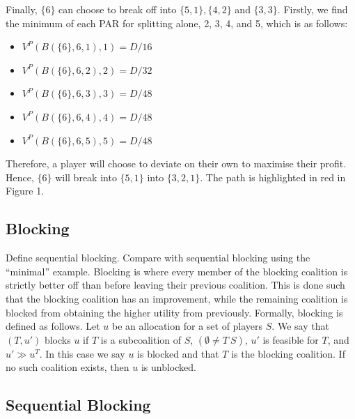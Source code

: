 \documentclass[sigconf,anonymous]{aamas}
\newcommand{\ykc}[1]{{\color{blue} #1}}
\begin{document}
Finally, $\{6\}$ can choose to break off into $\{5, 1\}, \{4, 2\}$ and $\{3, 3\}$. Firstly, we find the minimum of each PAR for splitting alone, 2, 3, 4, and 5, which is as follows: 
\begin{itemize}
	\item $V^P(B(\{6\}, 6, 1), 1) = D/16$
	\item $V^P(B(\{6\}, 6, 2), 2) = D/32$ 
	\item $V^P(B(\{6\}, 6, 3), 3) = D/48$
	\item $V^P(B(\{6\}, 6, 4), 4) = D/48$
	\item $V^P(B(\{6\}, 6, 5), 5) = D/48$
\end{itemize}
Therefore, a player will choose to deviate on their own to maximise their profit. Hence, $\{6\}$ will break into $\{5, 1\}$ into $\{3, 2, 1\}$. The path is highlighted in red in Figure 1. 

\subsection{Blocking}

\ykc{Define sequential blocking. Compare with sequential blocking using the ``minimal'' example.}
Blocking is where every member of the blocking coalition is strictly better off than before leaving their previous coalition. This is done such that the blocking coalition has an improvement, while the remaining coalition is blocked from obtaining the higher utility from previously. Formally, blocking is defined as follows. Let $u$ be an allocation for a set of players $S$. We say that $(T, u')$ blocks $u$ if $T$ is a subcoalition of $S$, $(\emptyset \neq T \ S)$, $u'$ is feasible for $T$, and $u' \gg u^T$. In this case we say $u$ is blocked and that $T$ is the blocking coalition. If no such coalition exists, then $u$ is unblocked.  

\subsection{Sequential Blocking} 
\end{document}
